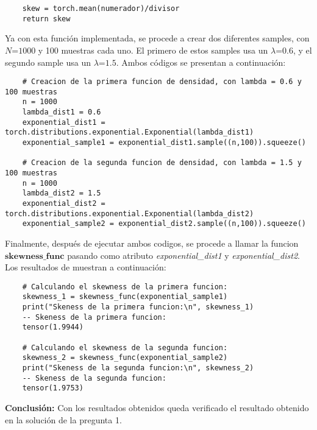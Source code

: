 \documentclass[spanish]{article}
\begin{document}
\begin{enumerate}
\begin{verbatim}
    skew = torch.mean(numerador)/divisor
    return skew
\end{verbatim}
Ya con esta funci\'{o}n implementada, se procede a crear dos diferentes samples, con $N\text{=1000}$ y 100 muestras cada uno. El primero de estos samples usa un $\lambda\text{=0.6}$, y el segundo sample usa un $\lambda\text{=1.5}$. Ambos c\'{o}digos se presentan a continuaci\'{o}n:
\begin{verbatim}
    # Creacion de la primera funcion de densidad, con lambda = 0.6 y 100 muestras
    n = 1000
    lambda_dist1 = 0.6
    exponential_dist1 = torch.distributions.exponential.Exponential(lambda_dist1)
    exponential_sample1 = exponential_dist1.sample((n,100)).squeeze()

    # Creacion de la segunda funcion de densidad, con lambda = 1.5 y 100 muestras
    n = 1000
    lambda_dist2 = 1.5
    exponential_dist2 = torch.distributions.exponential.Exponential(lambda_dist2)
    exponential_sample2 = exponential_dist2.sample((n,100)).squeeze()
\end{verbatim}
Finalmente, despu\'{e}s de ejecutar ambos codigos, se procede a llamar la funcion $\textbf{skewness\_func}$ pasando como atributo \emph{exponential\_dist1} y \emph{exponential\_dist2}. Los resultados de muestran a continuaci\'{o}n:
\begin{verbatim}
    # Calculando el skewness de la primera funcion:
    skewness_1 = skewness_func(exponential_sample1)
    print("Skeness de la primera funcion:\n", skewness_1)
    -- Skeness de la primera funcion:
    tensor(1.9944)

    # Calculando el skewness de la segunda funcion:
    skewness_2 = skewness_func(exponential_sample2)
    print("Skeness de la segunda funcion:\n", skewness_2)
    -- Skeness de la segunda funcion:
    tensor(1.9753)
\end{verbatim}
\textbf{Conclusi\'{o}n:} Con los resultados obtenidos queda verificado el resultado obtenido en la soluci\'{o}n de la pregunta 1.
\end{enumerate}
\end{document}
